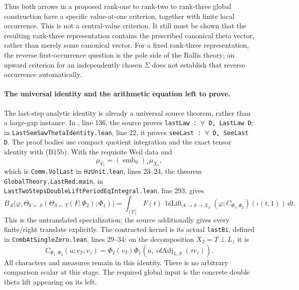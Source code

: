 \documentclass[11pt]{article}
\theoremstyle{definition}\newtheorem{definition}[theorem]{Definition}\newtheorem{remark}[theorem]{Remark}
\begin{document}
Thus both arrows in a proposed rank-one to rank-two to rank-three global construction have a specific value-at-one criterion, together with finite local occurrence. This is not a central-value criterion. It still must be shown that the resulting rank-three representation contains the prescribed canonical theta vector, rather than merely some canonical vector. For a fixed rank-three representation, the reverse first-occurrence question is the pole side of the Rallis theory; an upward criterion for an independently chosen $\Sigma$ does not establish that reverse occurrence automatically.

\paragraph{The universal identity and the arithmetic equation left to prove.}
The last-step analytic identity is already a universal source theorem, rather than a large-gap instance. In , line 136, the source proves \texttt{lastLaw : \ensuremath{\forall} D, LastLaw D}; in \texttt{LastSeeSawThetaIdentity.lean}, line 22, it proves \texttt{seeLast : \ensuremath{\forall} D, SeeLast D}. The proof bodies use compact quotient integration and the exact tensor identity with (B15b). With the requisite Weil data and
\[
 \mu_{V_1}=(\operatorname{emb}_0)_*\mu_{X_1},
 \tag{B15k}
\]
which is \texttt{Comm.VolLast} in \texttt{HzUnit.lean}, lines 23--24, the theorem \texttt{GlobalTheory.LastRed.main}, in \nolinkurl{LastTwoStepsDoubleLiftPeriodEqIntegral.lean}, line 293, gives
\[
 B_A\bigl(\varphi,
   \Theta_{V\leftarrow S}(\Theta_{S\leftarrow T}(F;\Phi_2);\Phi_1)\bigr)
  =\int_{[T]} F(t)\,
       \operatorname{biLift}_{A\to S\to X_2}
       (\varphi;C_{\Phi_1,\Phi_2})(\iota(t,1))\,dt.
 \tag{B15l}
\]
This is the untranslated specialization; the source additionally gives every finite/right translate explicitly. The contracted kernel is its actual \texttt{lastBi}, defined in \texttt{CombAtSingleZero.lean}, lines 29--34: on the decomposition $X_2=T\perp L_z$ it is
\[
 C_{\Phi_1,\Phi_2}(u;v_T,v_z)
       =\Phi_2(v_T)\Phi_1(u,\operatorname{ofAdj}_{L,S}(\tau v_z)).
\]
All characters and measures remain in this identity. There is no arbitrary comparison scalar at this stage. The required global input is the concrete double theta lift appearing on its left.
\end{document}
